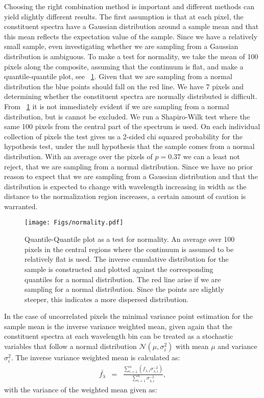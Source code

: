 \documentclass{aa}    %
\newcommand{\figref}[1]{\ref{fig:#1}}
\newcommand{\Fig}[1]{\figurename~\figref{#1}}
\newcommand{\fig}[1]{\Fig{#1}}
\newcommand{\figlabel}[1]{\label{fig:#1}}
\newcommand{\eqlabel}[1]{\label{eq:#1}}
\begin{document}
Choosing the right combination method is important and different methods can yield slightly different results. The first assumption is that at each pixel, the constituent spectra have a Gaussian distribution around a sample mean and that this mean reflects the expectation value of the sample. Since we have a relatively small sample, even investigating whether we are sampling from a Gaussian distribution is ambiguous. To make a test for normality, we take the mean of 100 pixels along the composite, assuming that the continuum is flat, and make a quantile-quantile plot, see \Fig{normality}. Given that we are sampling from a normal distribution the blue points should fall on the red line. We have 7 pixels and determining whether the constituent spectra are normally distributed is difficult. From \fig{normality} it is not immediately evident if we are sampling from a normal distribution, but is cannot be excluded. We run a Shapiro-Wilk test where the same 100 pixels from the central part of the spectrum is used. On each individual collection of pixels the test gives us a 2-sided chi squared probability for the hypothesis test, under the null hypothesis that the sample comes from a normal distribution. With an average over the pixels of $p = 0.37$ we can a least not reject, that we are sampling from a normal distribution. Since we have no prior reason to expect that we are sampling from a Gaussian distribution and that the distribution is expected to change with wavelength increasing in width as the distance to the normalization region increases, a certain amount of caution is warranted. 

\begin{figure}[t!]
  \centering
  \texttt{[image: Figs/normality.pdf]}
  \caption[]{Quantile-Quantile plot as a test for normality. An average over 100 pixels in the central regions where the continuum is assumed to be relatively flat is used. The inverse cumulative distribution for the sample is constructed and plotted against the corresponding quantiles for a normal distribution. The red line arise if we are sampling for a normal distribution. Since the points are slightly steeper, this indicates a more dispersed distribution.}
 \figlabel{normality}
\end{figure}

In the case of uncorrelated pixels the minimal variance point estimation for the sample mean is the inverse variance weighted mean, given again that the constituent spectra at each wavelength bin can be treated as a stochastic variables that follow a normal distribution $\mathcal{N}(\mu, \sigma_i^2)$ with mean $\mu$ and variance $\sigma_i^2$. The inverse variance weighted mean is calculated as:
\begin{eqnarray} \eqlabel{wmean}
\bar{f_{\lambda}} &=& \frac{ \sum_{i=1}^n \left( f_{\lambda, i} \sigma_{\lambda, i}^{-2} \right)}{\sum_{i=1}^n \sigma_{\lambda, i}^{-2}},
\end{eqnarray}
with the variance of the weighted mean given as: 
\end{document}
